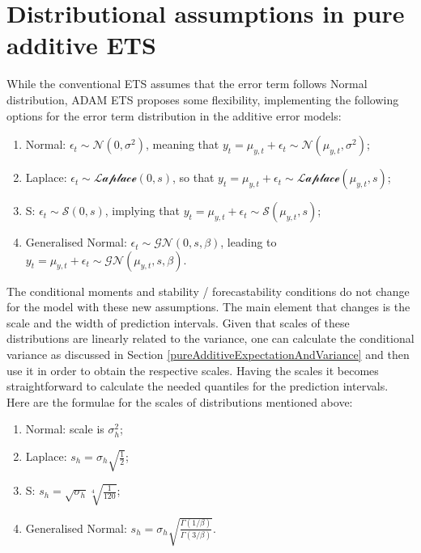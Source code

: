 \documentclass[
]{book}
\providecommand{\tightlist}{%
  \setlength{\itemsep}{0pt}\setlength{\parskip}{0pt}}
\theoremstyle{definition}
\theoremstyle{definition}
\theoremstyle{definition}
\theoremstyle{definition}
\theoremstyle{remark}
\begin{document}
\hypertarget{ADAMETSAdditiveDistributions}{%
\section{Distributional assumptions in pure additive ETS}\label{ADAMETSAdditiveDistributions}}

While the conventional ETS assumes that the error term follows Normal distribution, ADAM ETS proposes some flexibility, implementing the following options for the error term distribution in the additive error models:

\begin{enumerate}
\def\labelenumi{\arabic{enumi}.}
\tightlist
\item
  Normal: \(\epsilon_t \sim \mathcal{N}(0, \sigma^2)\), meaning that \(y_t = \mu_{y,t} + \epsilon_t \sim \mathcal{N}(\mu_{y,t}, \sigma^2)\);
\item
  Laplace: \(\epsilon_t \sim \mathcal{Laplace}(0, s)\), so that \(y_t = \mu_{y,t} + \epsilon_t \sim \mathcal{Laplace}(\mu_{y,t}, s)\);
\item
  S: \(\epsilon_t \sim \mathcal{S}(0, s)\), implying that \(y_t = \mu_{y,t} + \epsilon_t \sim \mathcal{S}(\mu_{y,t}, s)\);
\item
  Generalised Normal: \(\epsilon_t \sim \mathcal{GN}(0, s, \beta)\), leading to \(y_t = \mu_{y,t} + \epsilon_t \sim \mathcal{GN}(\mu_{y,t}, s, \beta)\).
\end{enumerate}

The conditional moments and stability / forecastability conditions do not change for the model with these new assumptions. The main element that changes is the scale and the width of prediction intervals. Given that scales of these distributions are linearly related to the variance, one can calculate the conditional variance as discussed in Section \ref{pureAdditiveExpectationAndVariance} and then use it in order to obtain the respective scales. Having the scales it becomes straightforward to calculate the needed quantiles for the prediction intervals. Here are the formulae for the scales of distributions mentioned above:

\begin{enumerate}
\def\labelenumi{\arabic{enumi}.}
\tightlist
\item
  Normal: scale is \(\sigma^2_h\);
\item
  Laplace: \(s_h = \sigma_h \sqrt{\frac{1}{2}}\);
\item
  S: \(s_h = \sqrt{\sigma_h}\sqrt[4]{\frac{1}{120}}\);
\item
  Generalised Normal: \(s_h = \sigma_h \sqrt{\frac{\Gamma(1/\beta)}{\Gamma(3/\beta)}}\).
\end{enumerate}
\end{document}
